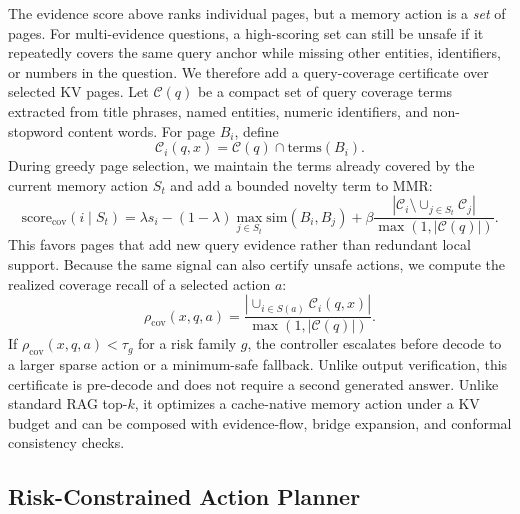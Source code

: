 \documentclass{article}
\begin{document}
The evidence score above ranks individual pages, but a memory action is a \emph{set} of pages.
For multi-evidence questions, a high-scoring set can still be unsafe if it repeatedly covers the same query anchor while missing other entities, identifiers, or numbers in the question.
We therefore add a query-coverage certificate over selected KV pages.
Let $\mathcal{C}(q)$ be a compact set of query coverage terms extracted from title phrases, named entities, numeric identifiers, and non-stopword content words.
For page $B_i$, define
\begin{equation}
    \mathcal{C}_i(q,x)
    =
    \mathcal{C}(q) \cap \mathrm{terms}(B_i).
\end{equation}
During greedy page selection, we maintain the terms already covered by the current memory action $S_t$ and add a bounded novelty term to MMR:
\begin{equation}
    \mathrm{score}_{\mathrm{cov}}(i\mid S_t)
    =
    \lambda s_i
    -
    (1-\lambda)\max_{j\in S_t}\mathrm{sim}(B_i,B_j)
    +
    \beta
    \frac{|\mathcal{C}_i \setminus \cup_{j\in S_t}\mathcal{C}_j|}
         {\max(1,|\mathcal{C}(q)|)}.
    \label{eq:coverage-mmr}
\end{equation}
This favors pages that add new query evidence rather than redundant local support.
Because the same signal can also certify unsafe actions, we compute the realized coverage recall of a selected action $a$:
\begin{equation}
    \rho_{\mathrm{cov}}(x,q,a)
    =
    \frac{|\cup_{i\in S(a)}\mathcal{C}_i(q,x)|}
         {\max(1,|\mathcal{C}(q)|)}.
    \label{eq:coverage-risk}
\end{equation}
If $\rho_{\mathrm{cov}}(x,q,a)<\tau_g$ for a risk family $g$, the controller escalates before decode to a larger sparse action or a minimum-safe fallback.
Unlike output verification, this certificate is pre-decode and does not require a second generated answer.
Unlike standard RAG top-$k$, it optimizes a cache-native memory action under a KV budget and can be composed with evidence-flow, bridge expansion, and conformal consistency checks.

\subsection{Risk-Constrained Action Planner}
\end{document}
